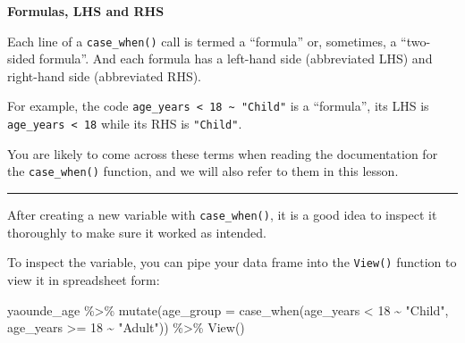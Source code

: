 \documentclass[
  letterpaper,
  DIV=11,
  numbers=noendperiod]{scrreprt}
\newenvironment{Shaded}{\begin{snugshade}}{\end{snugshade}}
\newcommand{\AttributeTok}[1]{\textcolor[rgb]{0.40,0.45,0.13}{#1}}
\newcommand{\DecValTok}[1]{\textcolor[rgb]{0.68,0.00,0.00}{#1}}
\newcommand{\FunctionTok}[1]{\textcolor[rgb]{0.28,0.35,0.67}{#1}}
\newcommand{\NormalTok}[1]{\textcolor[rgb]{0.00,0.23,0.31}{#1}}
\newcommand{\SpecialCharTok}[1]{\textcolor[rgb]{0.37,0.37,0.37}{#1}}
\newcommand{\StringTok}[1]{\textcolor[rgb]{0.13,0.47,0.30}{#1}}
\begin{document}
\begin{tcolorbox}[enhanced jigsaw, title=\textcolor{quarto-callout-note-color}{\faInfo}\hspace{0.5em}{Vocab}, colbacktitle=quarto-callout-note-color!10!white, leftrule=.75mm, arc=.35mm, opacityback=0, bottomrule=.15mm, rightrule=.15mm, toptitle=1mm, breakable, toprule=.15mm, colback=white, coltitle=black, colframe=quarto-callout-note-color-frame, bottomtitle=1mm, titlerule=0mm, left=2mm, opacitybacktitle=0.6]

\textbf{Formulas, LHS and RHS}

Each line of a \texttt{case\_when()} call is termed a ``formula'' or,
sometimes, a ``two-sided formula''. And each formula has a left-hand
side (abbreviated LHS) and right-hand side (abbreviated RHS).

For example, the code
\texttt{age\_years\ \textless{}\ 18\ \textasciitilde{}\ "Child"} is a
``formula'', its LHS is \texttt{age\_years\ \textless{}\ 18} while its
RHS is \texttt{"Child"}.

You are likely to come across these terms when reading the documentation
for the \texttt{case\_when()} function, and we will also refer to them
in this lesson.

\end{tcolorbox}

\begin{center}\rule{0.5\linewidth}{0.5pt}\end{center}

After creating a new variable with \texttt{case\_when()}, it is a good
idea to inspect it thoroughly to make sure it worked as intended.

To inspect the variable, you can pipe your data frame into the
\texttt{View()} function to view it in spreadsheet form:

\begin{Shaded}
\begin{Highlighting}[]
\NormalTok{yaounde\_age }\SpecialCharTok{\%\textgreater{}\%}  
  \FunctionTok{mutate}\NormalTok{(}\AttributeTok{age\_group =} \FunctionTok{case\_when}\NormalTok{(age\_years }\SpecialCharTok{\textless{}} \DecValTok{18} \SpecialCharTok{\textasciitilde{}} \StringTok{"Child"}\NormalTok{, }
\NormalTok{                               age\_years }\SpecialCharTok{\textgreater{}=} \DecValTok{18} \SpecialCharTok{\textasciitilde{}} \StringTok{"Adult"}\NormalTok{)) }\SpecialCharTok{\%\textgreater{}\%} 
  \FunctionTok{View}\NormalTok{()}
\end{Highlighting}
\end{Shaded}
\end{document}
